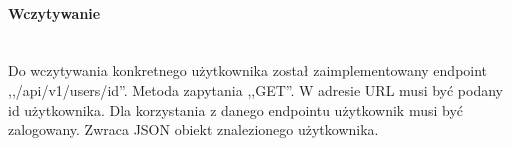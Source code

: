 
% 
\paragraph{Wczytywanie}\mbox{}\\

Do wczytywania konkretnego użytkownika został zaimplementowany endpoint ,,/api/v1/users/{id}''.
Metoda zapytania ,,GET''.
W adresie URL musi być podany id użytkownika.
Dla korzystania z danego endpointu użytkownik musi być zalogowany.
Zwraca JSON obiekt znalezionego użytkownika.

